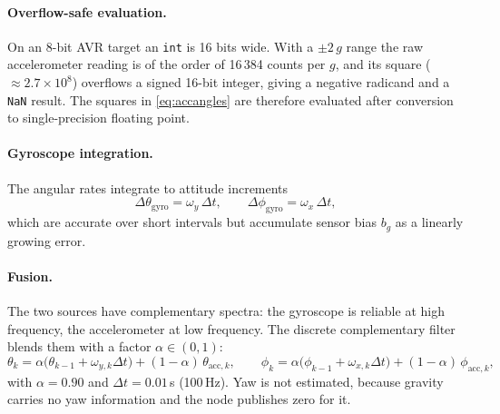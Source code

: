\documentclass[11pt,a4paper]{article}
\DeclareRobustCommand{\code}[1]{{\let\_\codeus\texttt{#1}}}
\newcommand{\codeus}{\textunderscore\allowbreak{}}
\begin{document}
\paragraph{Overflow-safe evaluation.} On an 8-bit AVR target an \code{int} is 16 bits wide. With a $\pm2\,g$ range the raw accelerometer reading is of the order of 16\,384 counts per $g$, and its square ($\approx2.7\times10^8$) overflows a signed 16-bit integer, giving a negative radicand and a \code{NaN} result. The squares in \eqref{eq:accangles} are therefore evaluated after conversion to single-precision floating point.
 
\paragraph{Gyroscope integration.} The angular rates integrate to attitude increments
\begin{equation}
\Delta\theta_{\mathrm{gyro}}=\omega_y\,\Delta t,\qquad \Delta\phi_{\mathrm{gyro}}=\omega_x\,\Delta t,
\end{equation}
which are accurate over short intervals but accumulate sensor bias $b_g$ as a linearly growing error.
 
\paragraph{Fusion.} The two sources have complementary spectra: the gyroscope is reliable at high frequency, the accelerometer at low frequency. The discrete complementary filter blends them with a factor $\alpha\in(0,1)$:
\begin{equation}
\theta_k=\alpha\bigl(\theta_{k-1}+\omega_{y,k}\Delta t\bigr)+(1-\alpha)\,\theta_{\mathrm{acc},k},\qquad
\phi_k=\alpha\bigl(\phi_{k-1}+\omega_{x,k}\Delta t\bigr)+(1-\alpha)\,\phi_{\mathrm{acc},k},
\label{eq:cf}
\end{equation}
with $\alpha=0.90$ and $\Delta t=0.01$\,s (100\,Hz). Yaw is not estimated, because gravity carries no yaw information and the node publishes zero for it.
 
\end{document}
